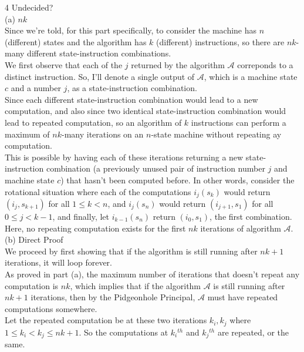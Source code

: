 \documentclass{article}
\begin{document}
{\Large 4 Undecided?} \\[.3cm]
{\color{red} (a) $nk$} \\[.3cm]
\indent Since we're told, for this part specifically, to consider the machine has $n$ (different) states and the algorithm has $k$ (different) instructions, so there are $nk$-many different state-instruction combinations. \\[.2cm]
\indent We first observe that each of the $j$ returned by the 
algorithm $\mathscr{A}$ correponds to a distinct instruction. So, I'll denote a single output of $\mathscr{A}$, which is a machine state $c$ and a number $j$, as a state-instruction combination. \\[.2cm]
\indent Since each different state-instruction combination would lead to a new computation, and also since two identical state-instruction combination would lead to repeated computation, so an algorithm of $k$ instructions can perform a maximum of $nk$-many iterations on an $n$-state machine without repeating ay computation. \\[.2cm]
\indent This is possible by having each of these iterations returning a new state-instruction combination (a previously unused pair of instruction number $j$ and machine state $c$) that hasn't been computed before.
In other words, consider the rotational situation where each of the computations
$i_j(s_k)$ would return $(i_j, s_{k+1})$ for all $1\leq k < n$,
and $i_j(s_n)$ would return $(i_{j+1}, s_1)$ for all $0\leq j < k-1$,
and finally, let $i_{k-1}(s_n)$ return $(i_0, s_1)$, the first combination.
Here, no repeating computation exists for the first $nk$ iterations of algorithm $\mathscr{A}$. \\[.5cm]
{\color{red} (b) Direct Proof} \\[.3cm]
\indent We proceed by first showing that if the algorithm is still running after $nk + 1$ iterations, it will loop forever. \\[.2cm]
\indent As proved in part (a), the maximum number of iterations that doesn't repeat any computation is $nk$, which implies that if the algorithm $\mathscr{A}$ is still running after $nk + 1$ iterations, then by the Pidgeonhole Principal, $\mathscr{A}$ must have repeated computations somewhere. \\[.2cm]
\indent Let the repeated computation be at these two iterations $k_i, k_j$ where $1\leq k_i < k_j\leq nk+1$. So the computations at $k_i$$^{th}$ and $k_j$$^{th}$ are repeated, or the same.
\end{document}
